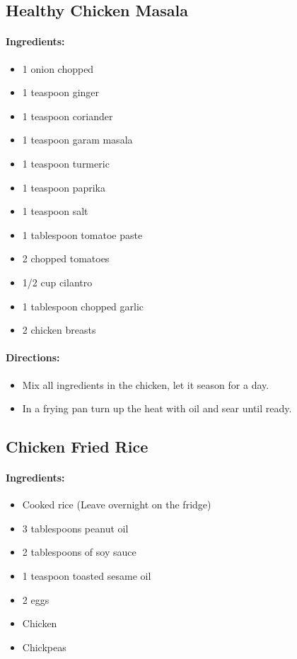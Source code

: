 \documentclass{article}
\begin{document}
\subsection{Healthy Chicken Masala}

\paragraph{Ingredients:}

\begin{itemize}
	\item 1 onion chopped
	\item 1 teaspoon ginger
	\item 1 teaspoon coriander
	\item 1 teaspoon garam masala
	\item 1 teaspoon turmeric
	\item 1 teaspoon paprika
	\item 1 teaspoon salt
	\item 1 tablespoon tomatoe paste
	\item 2 chopped tomatoes
	\item 1/2 cup cilantro
	\item 1 tablespoon chopped garlic
	\item 2 chicken breasts
\end{itemize}

\paragraph{Directions:}
\begin{itemize}
	\item Mix all ingredients in the chicken, let it season for a day. 
	\item In a frying pan turn up the heat with oil and sear until ready.
\end{itemize}



\subsection{Chicken Fried Rice}

\paragraph{Ingredients:}

\begin{itemize}
	\item Cooked rice (Leave overnight on the fridge)
	\item 3 tablespoons peanut oil
	\item 2 tablespoons of soy sauce
	\item 1 teaspoon toasted sesame oil
	\item 2 eggs
	\item Chicken
	\item Chickpeas
\end{itemize}
\end{document}
